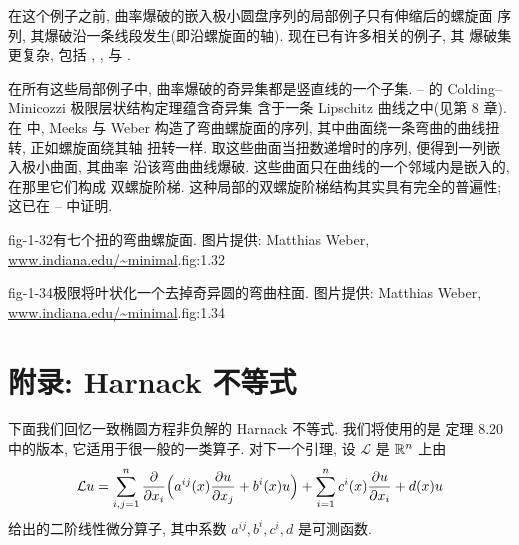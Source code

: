 在这个例子之前, 曲率爆破的嵌入极小圆盘序列的局部例子只有伸缩后的螺旋面
序列, 其爆破沿一条线段发生(即沿螺旋面的轴). 现在已有许多相关的例子, 其
爆破集更复杂, 包括 \cite{De2}, \cite{HoWh2}, \cite{Kh} 与 \cite{Kl}.

{\setlength{\emergencystretch}{3em}%
在所有这些局部例子中, 曲率爆破的奇异集都是竖直线的一个子集.
\cite{CM3}--\cite{CM6} 的 Colding--Minicozzi 极限层状结构定理蕴含奇异集
含于一条 Lipschitz 曲线之中(见第 8 章). 在 \cite{MeWe} 中, Meeks 与 Weber
构造了弯曲螺旋面的序列, 其中曲面绕一条弯曲的曲线扭转, 正如螺旋面绕其轴
扭转一样. 取这些曲面当扭数递增时的序列, 便得到一列嵌入极小曲面, 其曲率
沿该弯曲曲线爆破. 这些曲面只在曲线的一个邻域内是嵌入的, 在那里它们构成
双螺旋阶梯. 这种局部的双螺旋阶梯结构其实具有完全的普遍性; 这已在
\cite{CM3}--\cite{CM6} 中证明.\par}

  {fig-1-32}{有七个扭的弯曲螺旋面. 图片提供: Matthias Weber,
   \url{www.indiana.edu/~minimal}.}{fig:1.32}

  {fig-1-34}{极限将叶状化一个去掉奇异圆的弯曲柱面. 图片提供:
   Matthias Weber, \url{www.indiana.edu/~minimal}.}{fig:1.34}

\section*{附录: Harnack 不等式}
\label{sec:1.app-harnack}

下面我们回忆一致椭圆方程非负解的 Harnack 不等式. 我们将使用的是
\cite{GiTr} 定理 8.20 中的版本, 它适用于很一般的一类算子. 对下一个引理,
设 $\mathcal{L}$ 是 $\mathbb{R}^n$ 上由
\begin{equation}
\mathcal{L}u=\sum_{i,j=1}^{n}\frac{\partial}{\partial x_i}
 \Bigl(a^{ij}(x)\frac{\partial u}{\partial x_j}+b^{i}(x)u\Bigr)
 +\sum_{i=1}^{n}c^{i}(x)\frac{\partial u}{\partial x_i}+d(x)u
\label{eq:1.230}
\end{equation}
给出的二阶线性微分算子, 其中系数 $a^{ij},b^{i},c^{i},d$ 是可测函数.

